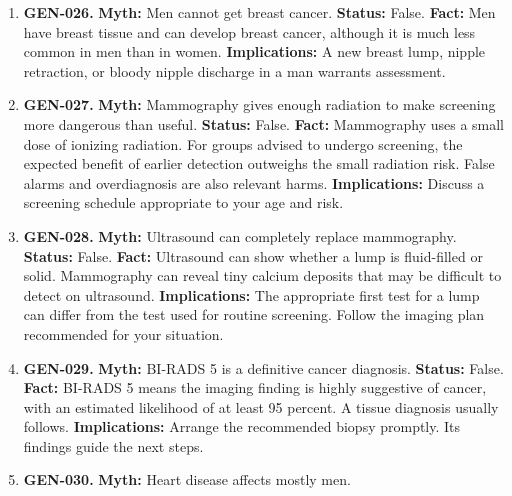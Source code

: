 \documentclass[11pt,oneside]{book}
\begin{document}
\begin{enumerate}[leftmargin=0pt,labelwidth=0pt,labelsep=0pt,itemindent=0pt]
\textbf{Implications:} Arrange assessment when you notice a new lump.
\item[] \textbf{GEN-026.} \textbf{Myth:} Men cannot get breast cancer.\newline
\textbf{Status:} False.\newline
\textbf{Fact:} Men have breast tissue and can develop breast cancer, although it is much less common in men than in women. \cite{ref245}\newline
\textbf{Implications:} A new breast lump, nipple retraction, or bloody nipple discharge in a man warrants assessment.
\item[] \textbf{GEN-027.} \textbf{Myth:} Mammography gives enough radiation to make screening more dangerous than useful.\newline
\textbf{Status:} False.\newline
\textbf{Fact:} Mammography uses a small dose of ionizing radiation. For groups advised to undergo screening, the expected benefit of earlier detection outweighs the small radiation risk. False alarms and overdiagnosis are also relevant harms. \cite{ref246}\newline
\textbf{Implications:} Discuss a screening schedule appropriate to your age and risk.
\item[] \textbf{GEN-028.} \textbf{Myth:} Ultrasound can completely replace mammography.\newline
\textbf{Status:} False.\newline
\textbf{Fact:} Ultrasound can show whether a lump is fluid-filled or solid. Mammography can reveal tiny calcium deposits that may be difficult to detect on ultrasound. \cite{ref312}\newline
\textbf{Implications:} The appropriate first test for a lump can differ from the test used for routine screening. Follow the imaging plan recommended for your situation.
\item[] \textbf{GEN-029.} \textbf{Myth:} BI-RADS 5 is a definitive cancer diagnosis.\newline
\textbf{Status:} False.\newline
\textbf{Fact:} BI-RADS 5 means the imaging finding is highly suggestive of cancer, with an estimated likelihood of at least 95 percent. A tissue diagnosis usually follows. \cite{ref274}\newline
\textbf{Implications:} Arrange the recommended biopsy promptly. Its findings guide the next steps.
\item[] \textbf{GEN-030.} \textbf{Myth:} Heart disease affects mostly men.\newline

\end{enumerate}
\end{document}
